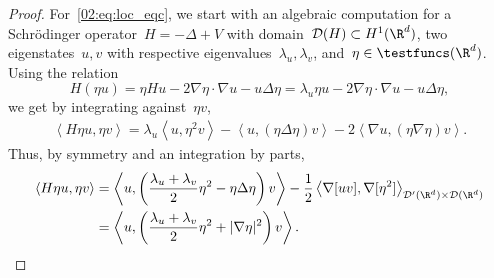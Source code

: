\begin{proof}
        For~\eqref{02:eq:loc_eqc}, we start with an algebraic computation for a Schrödinger operator~$H = -\Delta+V$ with domain~$\mathcal D(H)\subset H^1(\R^d)$, two eigenstates~$u,v$ with respective eigenvalues~$\lambda_u,\lambda_v$, and~$\eta\in\testfuncs(\R^d)$.
        Using the relation
        \[H(\eta u) = \eta H u - 2\nabla \eta\cdot \nabla u - u \Delta \eta = \lambda_u \eta u - 2 \nabla \eta \cdot \nabla u  - u \Delta \eta,\]
        we get by integrating against~$\eta v$,
            \begin{align*}
                \left\langle H\eta u,\eta v\right\rangle = \lambda_u\left\langle u,\eta^2 v\right\rangle - \left\langle u,\left(\eta\Delta\eta\right)v\right\rangle -2 \left\langle \nabla u,\left(\eta\nabla\eta\right)v\right\rangle.
            \end{align*}
            Thus, by symmetry and an integration by parts,
            \begin{equation}
                \label{02:eq:energy_localization_formula}
                \begin{split}
                \left\langle H\eta u,\eta v\right\rangle &= \left\langle u,\left(\frac{\lambda_u+\lambda_v}2\eta^2-\eta\Delta\eta\right)v\right\rangle -\frac12\left\langle \nabla[uv],\nabla[\eta^2]\right\rangle_{\mathcal D'(\R^d)\times \mathcal D(\R^d)}\\
                &= \left\langle u,\left(\frac{\lambda_u+\lambda_v}2\eta^2+|\nabla\eta|^2\right)v\right\rangle.
                \end{split}
            \end{equation}
        

\end{proof}

